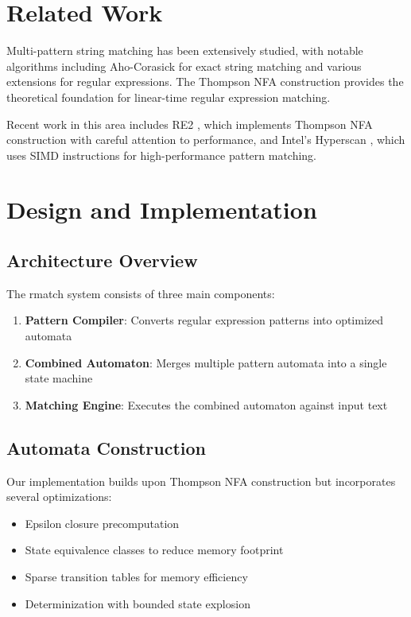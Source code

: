 \documentclass[twocolumn]{article}
\begin{document}
\section{Related Work}

Multi-pattern string matching has been extensively studied, with notable algorithms including Aho-Corasick \cite{aho1975efficient} for exact string matching and various extensions for regular expressions. The Thompson NFA construction \cite{thompson1968programming} provides the theoretical foundation for linear-time regular expression matching.

Recent work in this area includes RE2 \cite{cox2007regular}, which implements Thompson NFA construction with careful attention to performance, and Intel's Hyperscan \cite{wang2019hyperscan}, which uses SIMD instructions for high-performance pattern matching.

\section{Design and Implementation}

\subsection{Architecture Overview}

The rmatch system consists of three main components:

\begin{enumerate}
\item \textbf{Pattern Compiler}: Converts regular expression patterns into optimized automata
\item \textbf{Combined Automaton}: Merges multiple pattern automata into a single state machine
\item \textbf{Matching Engine}: Executes the combined automaton against input text
\end{enumerate}

\subsection{Automata Construction}

Our implementation builds upon Thompson NFA construction but incorporates several optimizations:

\begin{itemize}
\item Epsilon closure precomputation
\item State equivalence classes to reduce memory footprint  
\item Sparse transition tables for memory efficiency
\item Determinization with bounded state explosion
\end{itemize}
\end{document}
